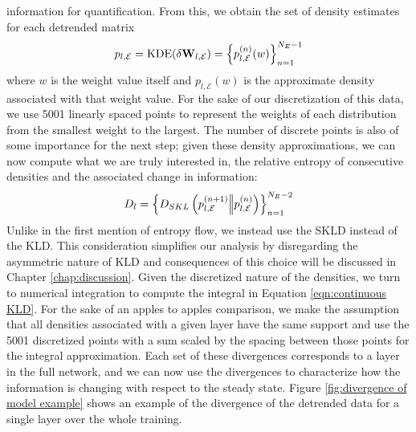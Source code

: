 information for quantification. From this, we obtain the set of density estimates for each detrended 
matrix
\begin{equation}
    p_{l,\mathcal{E}} = \text{KDE}(\delta{\bf W}_{l, \mathcal{E}}) = \left\{p_{l,\mathcal{E}}^{(n)}(w)\right\}_{n=1}^{N_E-1}
\end{equation}
where $w$ is the weight value itself and $p_{l,\mathcal{E}}(w)$ is the approximate density associated 
with that weight value. For the sake of our discretization of this data, we use 5001 linearly spaced 
points to represent the weights of each distribution from the smallest weight to the largest. The number 
of discrete points is also of some importance for the next step; given these density approximations, we 
can now compute what we are truly interested in, the relative entropy of consecutive densities and the 
associated change in information:
\begin{equation}
    D_l = \left\{D_{SKL}\left(p_{l,\mathcal{E}}^{(n+1)} \Big|\!\Big| p_{l,\mathcal{E}}^{(n)}\right)\right\}_{n=1}^{N_E-2}
\end{equation}
Unlike in the first mention of entropy flow, we instead use the SKLD instead of the KLD. This consideration
simplifies our analysis by disregarding the asymmetric nature of KLD and consequences of this choice 
will be discussed in Chapter \ref{chap:discussion}. Given the discretized nature of the densities, we turn 
to numerical integration to compute the integral in Equation \ref{eqn:continuous KLD}. For the sake of an 
apples to apples comparison, we make the assumption that all densities associated with a given layer 
have the same support and use the 5001 discretized points with a sum scaled by the spacing between those
points for the integral approximation. Each set of these divergences corresponds to a layer in the full 
network, and we can now use the divergences to characterize how the information is changing with respect 
to the steady state. Figure \ref{fig:divergence of model example} shows an example of the divergence 
of the detrended data for a single layer over the whole training. 

